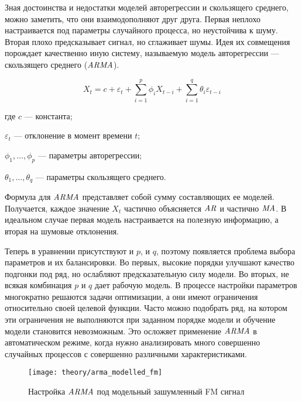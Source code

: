 Зная достоинства и недостатки моделей авторегрессии и скользящего среднего, можно заметить, что они взаимодополняют друг друга. Первая неплохо настраивается под параметры случайного процесса, но неустойчива к шуму. Вторая плохо предсказывает сигнал, но сглаживает шумы. Идея их совмещения порождает качественно иную систему, называемую модель авторегрессии --- скользящего среднего ($\mathit{ARMA}$). \cite{weber_time_series}

\begin{equation}
  \label{eq:theory:arma}
  X_t = c + \varepsilon_t + \sum_{i=1}^p \phi_i X_{t-i} + \sum_{i=1}^q \theta_i \varepsilon_{t-i}
\end{equation}
\begin{explanation}
\item[где] $c$ --- константа;
\item $\varepsilon_t$ --- отклонение в момент времени $t$;
\item $\phi_1, \dotsc, \phi_p$ --- параметры авторегрессии;
\item $\theta_1, \dotsc, \theta_q$ --- параметры скользящего среднего.
\end{explanation}

Формула для $\mathit{ARMA}$ представляет собой сумму составляющих ее моделей. Получается, каждое значение $X_t$ частично объясняется $\mathit{AR}$ и частично $\mathit{MA}$. В идеальном случае первая модель настраивается на полезную информацию, а вторая на шумовые отклонения.

Теперь в уравнении присутствуют и $p$, и $q$, поэтому появляется проблема выбора параметров и их балансировки. Во первых, высокие порядки улучшают качество подгонки под ряд, но ослабляют предсказательную силу модели. Во вторых, не всякая комбинация $p$ и $q$ дает рабочую модель. В процессе настройки параметров многократно решаются задачи оптимизации, а они имеют ограничения относительно своей целевой функции. Часто можно подобрать ряд, на котором эти ограничения не выполняются при заданном порядке модели и обучение модели становится невозможным. Это осложяет применение $\mathit{ARMA}$ в автоматическом режиме, когда нужно анализировать много совершенно случайных процессов с совершенно различными характеристиками.

\begin{figure}[h]
  \centering
  \texttt{[image: theory/arma\_modelled\_fm]}
  \caption{Настройка $\mathit{ARMA}$ под модельный зашумленный FM сигнал}
  \label{fig:theory:arma_modelled_fm}
\end{figure}

